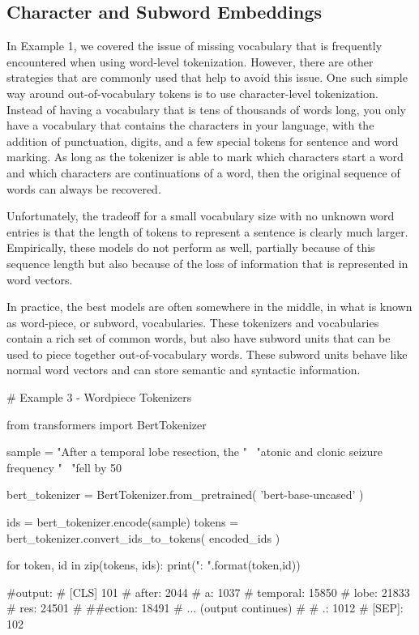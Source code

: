 \subsection{Character and Subword Embeddings}

In Example 1, we covered the issue of missing vocabulary that is frequently encountered when using word-level tokenization.
However, there are other strategies that are commonly used that help to avoid this issue.
One such simple way around out-of-vocabulary tokens is to use character-level tokenization.
Instead of having a vocabulary that is tens of thousands of words long, you only have a vocabulary that contains the characters in
your language, with the addition of punctuation, digits, and a few special tokens for sentence and word marking.
As long as the tokenizer is able to mark which characters start a word and which characters are continuations of a word, then the original sequence of words can always be recovered.

Unfortunately, the tradeoff for a small vocabulary size with no unknown word entries is that the length of tokens to represent a sentence is clearly much larger.
Empirically, these models do not perform as well, partially because of this sequence length but also because of the loss of information that is represented in word vectors.

In practice, the best models are often somewhere in the middle, in what is known as word-piece, or subword, vocabularies.
These tokenizers and vocabularies contain a rich set of common words, but also have subword units that can be used to piece together out-of-vocabulary words.
These subword units behave like normal word vectors and can store semantic and syntactic information.


\begin{python}
  # Example 3 - Wordpiece Tokenizers

  from transformers import BertTokenizer

  sample = "After a temporal lobe resection, the " \
           "atonic and clonic seizure frequency " \
           "fell by 50%

  bert_tokenizer = BertTokenizer.from_pretrained(
      'bert-base-uncased'
  )

  ids = bert_tokenizer.encode(sample)
  tokens = bert_tokenizer.convert_ids_to_tokens(
      encoded_ids
  )

  for token, id  in zip(tokens, ids):
      print("{}: {}".format(token,id))

  #output:
  # [CLS] 101
  # after: 2044
  # a: 1037
  # temporal: 15850
  # lobe: 21833
  # res: 24501
  # ##ection: 18491
  # ... (output continues)
  #   %
  # .: 1012
  # [SEP]: 102
\end{python}

